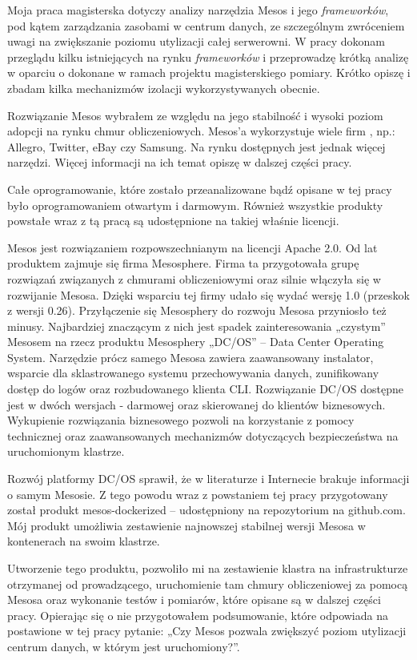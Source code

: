 \documentclass[10pt,a4paper,titlepage,twoside]{report}
\begin{document}
Moja praca magisterska dotyczy analizy narzędzia Mesos i jego \textit{frameworków}, pod kątem zarządzania zasobami w centrum danych, ze szczególnym zwróceniem uwagi na zwiększanie poziomu utylizacji całej serwerowni. W pracy dokonam przeglądu kilku istniejących na rynku \textit{frameworków} i przeprowadzę krótką analizę w oparciu o dokonane w ramach projektu magisterskiego pomiary. Krótko opiszę i zbadam kilka mechanizmów izolacji wykorzystywanych obecnie.

Rozwiązanie Mesos wybrałem ze względu na jego stabilność i wysoki poziom adopcji na rynku chmur obliczeniowych. Mesos’a wykorzystuje wiele firm \cite{ad16}, np.: Allegro, Twitter, eBay czy Samsung. Na rynku dostępnych jest jednak więcej narzędzi. Więcej informacji na ich temat opiszę w dalszej części pracy.

Całe oprogramowanie, które zostało przeanalizowane bądź opisane w tej pracy było oprogramowaniem otwartym i darmowym. Również wszystkie produkty powstałe wraz z tą pracą są udostępnione na takiej właśnie licencji.

Mesos jest rozwiązaniem rozpowszechnianym na licencji Apache 2.0. Od lat produktem zajmuje się firma Mesosphere. Firma ta przygotowała grupę rozwiązań związanych z chmurami obliczeniowymi oraz silnie włączyła się w rozwijanie Mesosa. Dzięki wsparciu tej firmy udało się wydać wersję 1.0 (przeskok z wersji 0.26). Przyłączenie się Mesosphery do rozwoju Mesosa przyniosło też minusy. Najbardziej znaczącym z nich jest spadek zainteresowania „czystym” Mesosem na rzecz produktu Mesosphery „DC/OS” – Data Center Operating System. Narzędzie prócz samego Mesosa zawiera zaawansowany instalator, wsparcie dla sklastrowanego systemu przechowywania danych, zunifikowany dostęp do logów oraz rozbudowanego klienta CLI. Rozwiązanie DC/OS dostępne jest w dwóch wersjach - darmowej oraz skierowanej do klientów biznesowych. Wykupienie rozwiązania biznesowego pozwoli na korzystanie z pomocy technicznej oraz zaawansowanych mechanizmów dotyczących bezpieczeństwa na uruchomionym klastrze.

Rozwój platformy DC/OS sprawił, że w literaturze i Internecie brakuje informacji o samym Mesosie. Z tego powodu wraz z powstaniem tej pracy przygotowany został produkt mesos-dockerized – udostępniony na repozytorium na github.com. Mój produkt umożliwia zestawienie najnowszej stabilnej wersji Mesosa w kontenerach na swoim klastrze.

Utworzenie tego produktu, pozwoliło mi na zestawienie klastra na infrastrukturze otrzymanej od prowadzącego, uruchomienie tam chmury obliczeniowej za pomocą Mesosa oraz wykonanie testów i pomiarów, które opisane są w dalszej części pracy. Opierając się o nie przygotowałem podsumowanie, które odpowiada na postawione w tej pracy pytanie: „Czy Mesos pozwala zwiększyć poziom utylizacji centrum danych, w którym jest uruchomiony?”.
\end{document}
